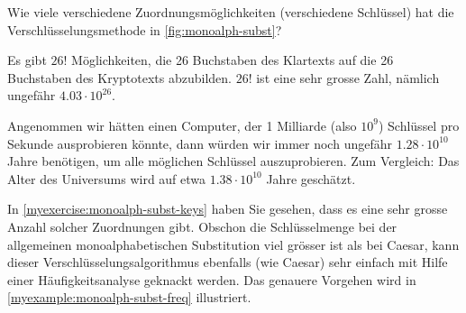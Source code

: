 \begin{myexercise}\label{myexercise:monoalph-subst-keys}
	Wie viele verschiedene Zuordnungsmöglichkeiten (verschiedene Schlüssel) hat die Verschlüsselungsmethode in \cref{fig:monoalph-subst}?
	\begin{myanswer}
		Es gibt $26!$ Möglichkeiten, die 26 Buchstaben des Klartexts auf die 26 Buchstaben des Kryptotexts abzubilden. $26!$ ist eine sehr grosse Zahl, nämlich ungefähr $4.03\cdot 10^{26}$.

		\par
		Angenommen wir hätten einen Computer, der 1 Milliarde (also $10^9$) Schlüssel pro Sekunde ausprobieren könnte, dann würden wir immer noch ungefähr $1.28\cdot 10^{10}$ Jahre benötigen, um alle möglichen Schlüssel auszuprobieren.
		Zum Vergleich: Das Alter des Universums wird auf etwa $1.38\cdot 10^{10}$ Jahre geschätzt.
	\end{myanswer}
\end{myexercise}

In \cref{myexercise:monoalph-subst-keys} haben Sie gesehen, dass es eine sehr grosse Anzahl solcher Zuordnungen gibt.
Obschon die Schlüsselmenge bei der allgemeinen monoalphabetischen Substitution viel grösser ist als bei Caesar, kann dieser Verschlüsselungsalgorithmus ebenfalls (wie Caesar) sehr einfach mit Hilfe einer Häufigkeitsanalyse geknackt werden.
Das genauere Vorgehen wird in \cref{myexample:monoalph-subst-freq} illustriert.

